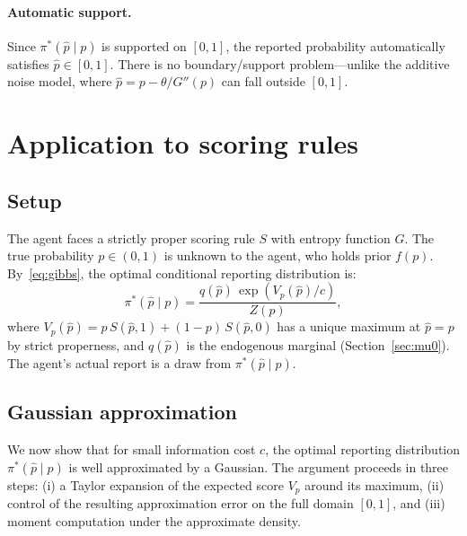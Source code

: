 \documentclass[11pt]{article}
\begin{document}
\paragraph{Automatic support.} Since $\pi^*(\hat{p} \mid p)$ is supported on $[0,1]$, the reported probability automatically satisfies $\hat{p} \in [0,1]$. There is no boundary/support problem---unlike the additive noise model, where $\hat{p} = p - \theta/G''(p)$ can fall outside $[0,1]$.


\section{Application to scoring rules}

\subsection{Setup}

The agent faces a strictly proper scoring rule $S$ with entropy function $G$. The true probability $p \in (0,1)$ is unknown to the agent, who holds prior $f(p)$. By~\eqref{eq:gibbs}, the optimal conditional reporting distribution is:
\begin{equation}\label{eq:gibbs-scoring}
\pi^*(\hat{p} \mid p) = \frac{q(\hat{p})\,\exp(V_p(\hat{p})/c)}{Z(p)},
\end{equation}
where $V_p(\hat{p}) = p\,S(\hat{p},1) + (1-p)\,S(\hat{p},0)$ has a unique maximum at $\hat{p} = p$ by strict properness, and $q(\hat{p})$ is the endogenous marginal (Section~\ref{sec:mu0}). The agent's actual report is a draw from $\pi^*(\hat{p} \mid p)$.

\subsection{Gaussian approximation}\label{sec:gaussian-approx}

We now show that for small information cost $c$, the optimal reporting distribution $\pi^*(\hat{p} \mid p)$ is well approximated by a Gaussian. The argument proceeds in three steps: (i) a Taylor expansion of the expected score $V_p$ around its maximum, (ii) control of the resulting approximation error on the full domain $[0,1]$, and (iii) moment computation under the approximate density.

\medskip
\end{document}
